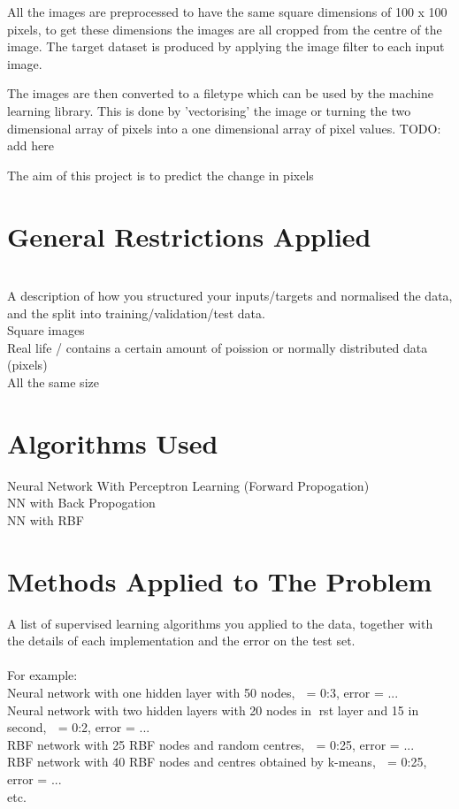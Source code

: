 \documentclass[11pt]{article}
\begin{document}
\begin{page}
All the images are preprocessed to have the same square dimensions of 100 x 100 pixels, to get these dimensions the images are all cropped from the centre of the image. The target dataset is produced by applying the image filter to each input image.

The images are then converted to a filetype which can be used by the machine learning library. This is done by 'vectorising' the image or turning the two dimensional array of pixels into a one dimensional array of pixel values. TODO: add here

The aim of this project is to predict the change in pixels 

\section{General Restrictions Applied}
\\A description of how you structured your inputs/targets and normalised the data, and the
split into training/validation/test data.\\

Square images\\
Real life / contains a certain amount of poission or normally distributed data (pixels)\\
All the same size\\

\section{Algorithms Used}
Neural Network With Perceptron Learning (Forward Propogation)\\
NN with Back Propogation\\
NN with RBF\\

\section{Methods Applied to The Problem}
A list of supervised learning algorithms you applied to the data, together with the details
of each implementation and the error on the test set.\\\\
For example:\\
Neural network with one hidden layer with 50 nodes,  = 0:3, error = ...\\
Neural network with two hidden layers with 20 nodes in rst layer and 15 in second,  = 0:2,
error = ...\\
RBF network with 25 RBF nodes and random centres,  = 0:25, error = ...\\
RBF network with 40 RBF nodes and centres obtained by k-means,  = 0:25, error = ...\\
etc.\\


\end{page}
\end{document}
